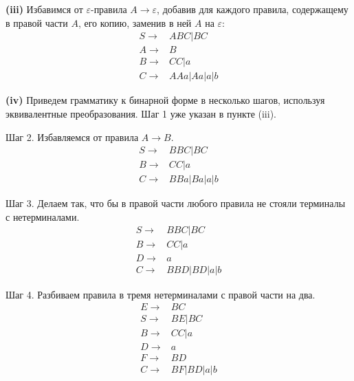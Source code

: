\documentclass[10pt]{article}
\let \eps \varepsilon
\begin{document}
\smallskip

{\bf (iii)}
Избавимся от $\eps$-правила $A \rightarrow \eps$, добавив для каждого правила, содержащему в правой части $A$, его копию, заменив в ней $A$ на $\eps$:
\begin{align*}
  S \rightarrow& ABC | BC \\
  A \rightarrow& B \\
  B \rightarrow& CC | a \\
  C \rightarrow& AAa | Aa | a | b
\end{align*}

\smallskip

{\bf (iv)}
Приведем грамматику к бинарной форме в несколько шагов, используя эквивалентные преобразования. Шаг 1 уже указан в пункте (iii).

Шаг 2. Избавляемся от правила $A \rightarrow B$.
\begin{align*}
  S \rightarrow& BBC | BC \\
  B \rightarrow& CC | a \\
  C \rightarrow& BBa | Ba | a | b
\end{align*}

Шаг 3. Делаем так, что бы в правой части любого правила не стояли терминалы с нетерминалами.
\begin{align*}
  S \rightarrow& BBC | BC \\
  B \rightarrow& CC | a \\
  D \rightarrow& a \\
  C \rightarrow& BBD | BD | a | b
\end{align*}

Шаг 4. Разбиваем правила в тремя нетерминалами с правой части на два.
\begin{align*}
  E \rightarrow& BC \\
  S \rightarrow& BE | BC \\
  B \rightarrow& CC | a \\
  D \rightarrow& a \\
  F \rightarrow& BD \\
  C \rightarrow& BF | BD | a | b
\end{align*}
\end{document}
